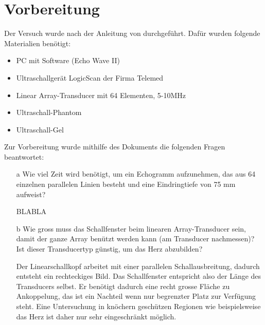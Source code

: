 \documentclass[11pt]{scrartcl}
\begin{document}

    \section{Vorbereitung}
   
    Der Versuch wurde nach der Anleitung von \cite{Echographie} durchgeführt.
    Dafür wurden folgende Materialien benötigt:

    \begin{itemize}
        \item PC mit Software (Echo Wave II)
        \item Ultraschallgerät LogicScan der Firma Telemed
        \item Linear Array-Transducer mit 64 Elementen, 5-10MHz
        \item Ultraschall-Phantom
        \item Ultraschall-Gel
        
    \end{itemize}

    Zur Vorbereitung wurde mithilfe des Dokuments \cite{medUS} die folgenden Fragen beantwortet: %

    \begin{itemize}
        \item[a] Wie viel Zeit wird benötigt, um ein Echogramm aufzunehmen, das aus 64 einzelnen parallelen Linien besteht und eine Eindringtiefe von 75 mm aufweist?
        \item[]  BLABLA
        \item[b] Wie gross muss das Schallfenster beim linearen Array-Transducer sein, damit der ganze Array benützt werden kann (am Transducer nachmessen)?
                 Ist dieser Transducertyp günstig, um das Herz abzubilden?
        \item[]  Der Linearschallkopf arbeitet mit einer parallelen Schallausbreitung, dadurch entsteht ein rechteckiges Bild.
        Das Schallfenster entspricht also der Länge des Transducers selbst.
        Er benötigt dadurch eine recht grosse Fläche zu Ankoppelung, das ist ein Nachteil wenn nur begrenzter Platz zur Verfügung steht.
        Eine Untersuchung in knöchern geschützen Regionen wie
        beispielsweise das Herz ist daher nur sehr eingeschränkt möglich.
    \end{itemize}
\end{document}
